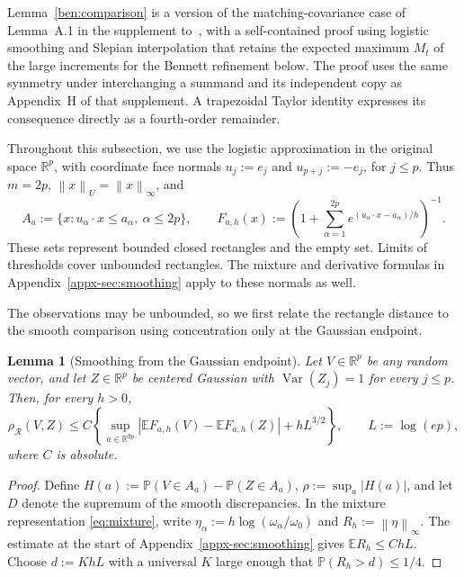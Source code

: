 \documentclass[11pt,letterpaper]{article}
\newenvironment{recovered}{}{}
\newtheorem{lemma}{Lemma}
\theoremstyle{remark}
\newcommand{\E}{\mathbb E}
\newcommand{\Pp}{\mathbb P}
\newcommand{\R}{\mathbb R}
\newcommand{\Var}{\operatorname{Var}}
\newcommand{\norm}[1]{\left\lVert#1\right\rVert}
\newcommand{\rh}{\rho_{\mathcal R}}
\begin{document}
\begin{recovered}
Lemma~\ref{ben:comparison} is a version of the matching-covariance
case of Lemma~A.1 in the supplement to~\cite{CCKK2022}, with a
self-contained proof using logistic smoothing and Slepian interpolation
that retains the expected maximum \(M_t\) of the large increments
for the Bennett refinement below. The proof uses the same symmetry
under interchanging a summand and its independent copy as Appendix~H
of that supplement. A trapezoidal Taylor identity expresses its
consequence directly as a fourth-order remainder.

Throughout this subsection, we use the logistic approximation in the
original space \(\R^p\), with coordinate face normals
\(u_j:=e_j\) and \(u_{p+j}:=-e_j\), for \(j\le p\).
Thus \(m=2p\), \(\norm x_U=\norm x_\infty\), and
\[
 A_a:=\{x:u_\alpha\cdot x\le a_\alpha,\ \alpha\le2p\},\qquad
 F_{a,h}(x):=\left(1+\sum_{\alpha=1}^{2p}
          e^{(u_\alpha\cdot x-a_\alpha)/h}\right)^{-1}.
\]
These sets represent bounded closed rectangles and the empty set.
Limits of thresholds cover unbounded rectangles. The mixture and
derivative formulas in Appendix~\ref{appx-sec:smoothing} apply to
these normals as well.

The observations may be unbounded, so we first relate the rectangle
distance to the smooth comparison using concentration only at the
Gaussian endpoint.

\begin{lemma}[Smoothing from the Gaussian endpoint]\label{ben:smoothing}
Let \(V\in\R^p\) be any random vector, and let \(Z\in\R^p\)
be centered Gaussian with \(\Var(Z_j)=1\) for every \(j\le p\).
Then, for every \(h>0\),
\begin{equation}\label{ben:gaussian-smoothing}
 \rh(V,Z)\le C\left\{
 \sup_{a\in\R^{2p}}|\E F_{a,h}(V)-\E F_{a,h}(Z)|
       +hL^{3/2}\right\},\qquad L:=\log(ep),
\end{equation}
where \(C\) is absolute.
\end{lemma}
\begin{proof}
{Define} \(H(a):=\Pp(V\in A_a)-\Pp(Z\in A_a)\),
\(\rho:=\sup_a|H(a)|\), and let \(D\) denote the supremum of
the smooth discrepancies. In the mixture representation
\eqref{eq:mixture}, write
\(\eta_\alpha:=h\log(\omega_\alpha/\omega_0)\) and
\(R_h:=\norm\eta_\infty\). The estimate at the start of
Appendix~\ref{appx-sec:smoothing} gives \(\E R_h\le ChL\).
Choose \(d:=KhL\) with a universal \(K\) large enough that
\(\Pp(R_h>d)\le1/4\).


\end{proof}
\end{recovered}
\end{document}
